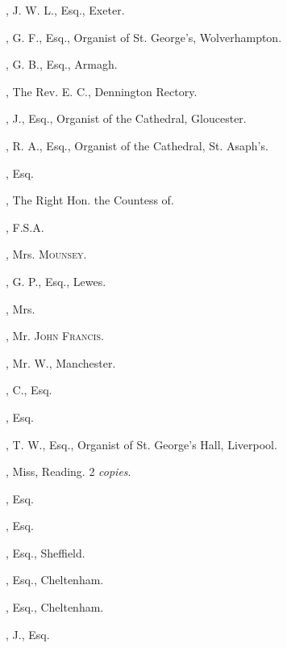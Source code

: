 
\thispagestyle{empty}
\setcounter{page}{17}

\setlength{\columnseprule}{0.4pt}
\begin{multicols}{2}\small
\setlength{\parindent}{0em}
\setlength{\parskip}{0em}
\raggedright
\raggedcolumns
{}, J. W. L., Esq., Exeter.

, G. F., Esq., Organist of St.
George’s, Wolverhampton.

, G. B., Esq., Armagh.

, The Rev. E. C., Dennington
Rectory.

, J., Esq., Organist of the Cathedral,
Gloucester.

, R. A., Esq., Organist of the
Cathedral, St. Asaph’s.

, Esq.

, The Right Hon. the
Countess of.

, F.S.A.
\bigskip

, Mrs. \textsc{Mounsey}.

, G. P., Esq., Lewes.

, Mrs.

, Mr. \textsc{John Francis}.

, Mr. W., Manchester.

, C., Esq.

, Esq.

, T. W., Esq., Organist of St. George’s
Hall, Liverpool.

, Miss, Reading. 2 \textit{copies}.

, Esq.

, Esq.

, Esq., Sheffield.

, Esq., Cheltenham.

, Esq., Cheltenham.

, J., Esq.


\end{multicols}
